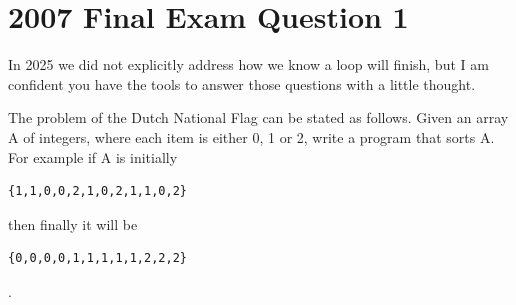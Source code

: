 \documentclass[twoside=false,DIV=14]{scrartcl}
\begin{document}
\section{2007 Final Exam Question 1}
\begin{note}
In 2025 we did not explicitly address how we know a loop will finish, but I am confident you have the tools to answer those questions with a little thought.
\end{note}
The problem of the Dutch National Flag can be stated as follows. Given an array A of integers, where each item is either 0, 1 or 2, write a program that sorts A. For example if A is initially 
\begin{verbatim}
{1,1,0,0,2,1,0,2,1,1,0,2}
\end{verbatim} 
then finally it will be 
\begin{verbatim}
{0,0,0,0,1,1,1,1,1,2,2,2}
\end{verbatim}.
\end{document}
